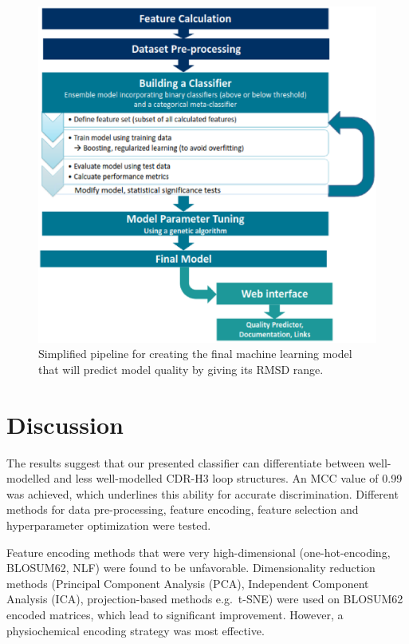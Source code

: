 \documentclass[12pt]{article}
\begin{document}
\begin{figure}
  \includegraphics[scale=0.45]{method.eps}
  \caption {Simplified pipeline for creating the final machine
    learning model that will predict model quality by giving its RMSD
    range.}
  \label{fig:method}
\end{figure}



\section{Discussion}
The results suggest that our presented classifier can differentiate
between well-modelled and less well-modelled CDR-H3 loop
structures. An MCC value of 0.99 was achieved, which underlines this
ability for accurate discrimination. Different methods for data
pre-processing, feature encoding, feature selection and hyperparameter
optimization were tested.

Feature encoding methods that were very high-dimensional
(one-hot-encoding, BLOSUM62, NLF) were found to be
unfavorable. Dimensionality reduction methods (Principal Component
Analysis (PCA), Independent Component Analysis (ICA), projection-based
methods e.g.\ t-SNE) were used on BLOSUM62 encoded matrices, which lead
to significant improvement. However, a physiochemical encoding
strategy was most effective.
\end{document}
